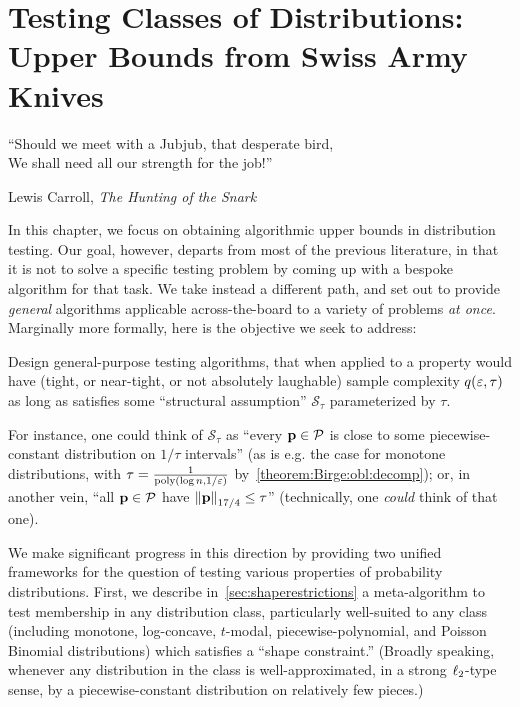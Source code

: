 \chapter{Testing Classes of Distributions: Upper Bounds from Swiss Army Knives}\label{chap:unified:ub}

\epigraph{``Should we meet with a Jubjub, that desperate bird,\\
We shall need all our strength for the job!''}{Lewis Carroll, \textit{The Hunting of the Snark}}

\renewcommand{\theIRL}{\textsf{Succinctness}}
\newcommand*{\inlineref}[1]{\refstepcounter{IRL}({\theIRL})\label{#1}}
\newcommand{\RightComment}[1]{\Comment{\parbox[t]{.30\linewidth}{\small#1}}} %

In this chapter, we focus on obtaining algorithmic upper bounds in distribution testing. Our goal, however, departs from most of the previous literature, in that it is not to solve a specific testing problem by coming up with a bespoke algorithm for that task. We take instead a different path, and set out to provide \emph{general} algorithms applicable across-the-board to a variety of problems \emph{at once}. Marginally more formally, here is the objective we seek to address:
\begin{problem}\label{problem:ub:general}
Design general-purpose testing algorithms, that when applied to a property \property would have (tight, or near-tight, or not absolutely laughable) sample complexity $q(\eps, \tau)$ as long as \property satisfies some ``structural assumption'' $\mathcal{S}_\tau$ parameterized by $\tau$.
\end{problem}
\noindent For instance, one could think of $\mathcal{S}_\tau$ as ``every $\D\in\property$ is close to some piecewise-constant distribution on $1/\tau$ intervals'' (as is e.g. the case for monotone distributions, with $\tau=\frac{1}{\poly(\log n, 1/\eps)}$ by~\cref{theorem:Birge:obl:decomp}); or, in another vein, ``all $\D\in\property$ have $\norm{\D}_{17/4} \leq \tau$'' (technically, one \emph{could} think of that one).  

We make significant progress in this direction by providing two unified frameworks for the question of testing various properties of probability distributions. First, we describe in~\cref{sec:shaperestrictions} a meta-algorithm to test membership in any distribution class, particularly well-suited to any class (including monotone, log-concave, $t$-modal, piecewise-polynomial, and Poisson Binomial distributions) which satisfies a ``shape constraint.'' (Broadly speaking, whenever any distribution in the class is well-approximated, in a strong $\lp[2]$-type sense, by a piecewise-constant distribution on relatively few pieces.)

